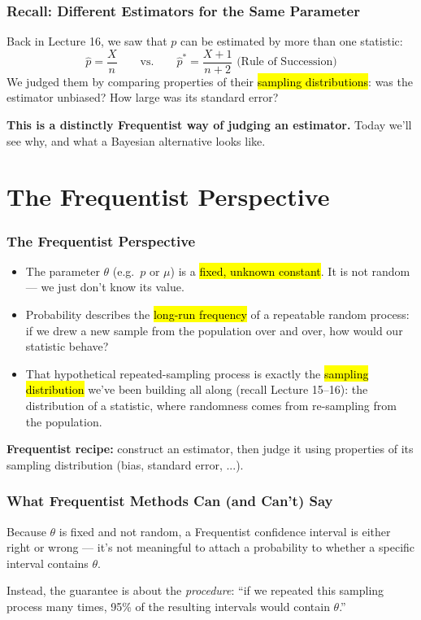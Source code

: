 \documentclass[slidestop,compress,mathserif]{beamer}
\begin{document}
\begin{frame}
    \frametitle{Recall: Different Estimators for the Same Parameter}
    Back in Lecture 16, we saw that $p$ can be estimated by more than one statistic:
    \[
    \hat{p}=\frac{X}{n} \qquad \text{vs.} \qquad \hat{p}^*=\frac{X+1}{n+2} \text{ (Rule of Succession)}
    \]
    \pause
    We judged them by comparing properties of their \hl{sampling distributions}: was the estimator unbiased? How large was its standard error?
    \pause

    \medskip
    \textbf{This is a distinctly Frequentist way of judging an estimator.} Today we'll see why, and what a Bayesian alternative looks like.
\end{frame}


\section{The Frequentist Perspective}

\begin{frame}
    \frametitle{The Frequentist Perspective}
    \begin{itemize}
        \item The parameter $\theta$ (e.g.\ $p$ or $\mu$) is a \hl{fixed, unknown constant}. It is not random --- we just don't know its value.
        \pause
        \item Probability describes the \hl{long-run frequency} of a repeatable random process: if we drew a new sample from the population over and over, how would our statistic behave?
        \pause
        \item That hypothetical repeated-sampling process is exactly the \hl{sampling distribution} we've been building all along (recall Lecture 15--16): the distribution of a statistic, where randomness comes from re-sampling from the population.
    \end{itemize}
    \pause

    \medskip
    \textbf{Frequentist recipe:} construct an estimator, then judge it using properties of its sampling distribution (bias, standard error, ...).
\end{frame}

\begin{frame}
    \frametitle{What Frequentist Methods Can (and Can't) Say}
    Because $\theta$ is fixed and not random, a Frequentist confidence interval is either right or wrong --- it's not meaningful to attach a probability to whether a specific interval contains $\theta$.
    \pause

    \medskip
    Instead, the guarantee is about the \emph{procedure}: ``if we repeated this sampling process many times, 95\% of the resulting intervals would contain $\theta$.''
    \pause

    \medskip
\end{frame}
\end{document}
